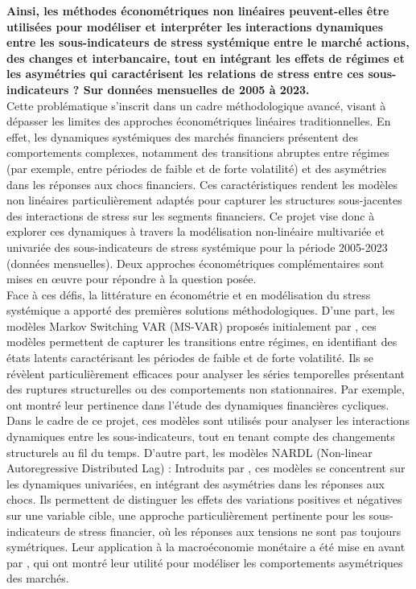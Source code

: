 \begin{sloppypar}
\textbf{Ainsi, les méthodes économétriques non linéaires peuvent-elles être utilisées pour modéliser et interpréter les interactions dynamiques entre les sous-indicateurs de stress systémique entre le marché actions, des changes et interbancaire, tout en intégrant les effets de régimes et les asymétries qui caractérisent les relations de stress entre ces sous-indicateurs ? Sur données mensuelles de 2005 à 2023.}\\

Cette problématique s’inscrit dans un cadre méthodologique avancé, visant à dépasser les limites des approches économétriques linéaires traditionnelles. En effet, les dynamiques systémiques des marchés financiers présentent des comportements complexes, notamment des transitions abruptes entre régimes (par exemple, entre périodes de faible et de forte volatilité) et des asymétries dans les réponses aux chocs financiers. Ces caractéristiques rendent les modèles non linéaires particulièrement adaptés pour capturer les structures sous-jacentes des interactions de stress sur les segments financiers. Ce projet vise donc à explorer ces dynamiques à travers la modélisation non-linéaire multivariée et univariée des sous-indicateurs de stress systémique pour la période 2005-2023 (données mensuelles). Deux approches économétriques complémentaires sont mises en œuvre pour répondre à la question posée.\\

Face à ces défis, la littérature en économétrie et en modélisation du stress systémique a apporté des premières solutions méthodologiques. D'une part, les modèles Markov Switching VAR (MS-VAR) proposés initialement par \cite[1989]{Hamilton}, ces modèles permettent de capturer les transitions entre régimes, en identifiant des états latents caractérisant les périodes de faible et de forte volatilité. Ils se révèlent particulièrement efficaces pour analyser les séries temporelles présentant des ruptures structurelles ou des comportements non stationnaires. Par exemple, \cite[2012]{Ang et Timmermann} ont montré leur pertinence dans l’étude des dynamiques financières cycliques. Dans le cadre de ce projet, ces modèles sont utilisés pour analyser les interactions dynamiques entre les sous-indicateurs, tout en tenant compte des changements structurels au fil du temps. D'autre part, les modèles NARDL (Non-linear Autoregressive Distributed Lag) : Introduits par \cite[2014]{Shin}, ces modèles se concentrent sur les dynamiques univariées, en intégrant des asymétries dans les réponses aux chocs. Ils permettent de distinguer les effets des variations positives et négatives sur une variable cible, une approche particulièrement pertinente pour les sous-indicateurs de stress financier, où les réponses aux tensions ne sont pas toujours symétriques. Leur application à la macroéconomie monétaire a été mise en avant par \cite[2013]{Balcilar et Ozdemir}, qui ont montré leur utilité pour modéliser les comportements asymétriques des marchés.\\


\end{sloppypar}
